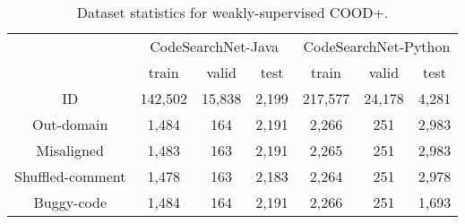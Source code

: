


\begin{table}[]
\centering
\caption{Dataset statistics for weakly-supervised COOD+.}%
\label{tabs:dataset}
\small
\begin{tabular}{c|ccc|ccc}
\hline
\multicolumn{1}{l|}{\multirow{2}{*}{}} & \multicolumn{3}{c|}{CodeSearchNet-Java}                               & \multicolumn{3}{c}{CodeSearchNet-Python}                              \\ \cline{2-7} 
\multicolumn{1}{l|}{}                  & \multicolumn{1}{c|}{train}   & \multicolumn{1}{c|}{valid} & test & \multicolumn{1}{c|}{train}   & \multicolumn{1}{c|}{valid} & test \\ \hline
ID                                     & \multicolumn{1}{c|}{142,502} & \multicolumn{1}{c|}{15,838}     & 2,199 & \multicolumn{1}{c|}{217,577} & \multicolumn{1}{c|}{24,178}     & 4,281 \\
Out-domain                & \multicolumn{1}{c|}{1,484}   & \multicolumn{1}{c|}{164}        & 2,191 & \multicolumn{1}{c|}{2,266}   & \multicolumn{1}{c|}{251}        & 2,983 \\
Misaligned                & \multicolumn{1}{c|}{1,483}   & \multicolumn{1}{c|}{163}        & 2,191 & \multicolumn{1}{c|}{2,265}   & \multicolumn{1}{c|}{251}        & 2,983 \\
Shuffled-comment          & \multicolumn{1}{c|}{1,478}   & \multicolumn{1}{c|}{163}        & 2,183 & \multicolumn{1}{c|}{2,264}   & \multicolumn{1}{c|}{251}        & 2,978 \\
Buggy-code        & \multicolumn{1}{c|}{1,484}   & \multicolumn{1}{c|}{164}        & 2,191 & \multicolumn{1}{c|}{2,266}   & \multicolumn{1}{c|}{251}        & 1,693 \\ \hline
\end{tabular}
\end{table}

